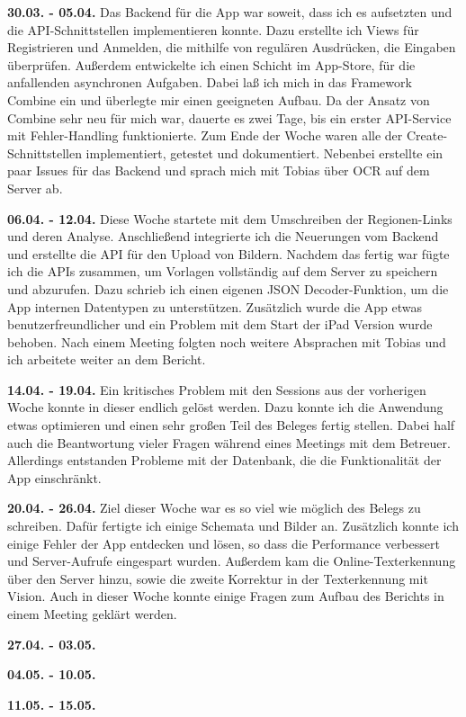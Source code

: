 \documentclass[nomenclature, oneside, 150]{HSMW-Thesis}
\begin{document}
	\textbf{30.03. - 05.04.} 
	Das Backend für die App war soweit, dass ich es aufsetzten und die API-Schnittstellen implementieren konnte. Dazu erstellte ich Views für Registrieren und Anmelden, die mithilfe von regulären Ausdrücken, die Eingaben überprüfen. Außerdem entwickelte ich einen Schicht im App-Store, für die anfallenden asynchronen Aufgaben. Dabei laß ich mich in das Framework Combine ein und überlegte mir einen geeigneten Aufbau. Da der Ansatz von Combine sehr neu für mich war, dauerte es zwei Tage, bis ein erster API-Service mit Fehler-Handling funktionierte. Zum Ende der Woche waren alle der Create-Schnittstellen implementiert, getestet und dokumentiert. Nebenbei erstellte ein paar Issues für das Backend und sprach mich mit Tobias über OCR auf dem Server ab.
	
	\textbf{06.04. - 12.04.}
	Diese Woche startete mit dem Umschreiben der Regionen-Links und deren Analyse. Anschließend integrierte ich die Neuerungen vom Backend und erstellte die API für den Upload von Bildern. Nachdem das fertig war fügte ich die APIs zusammen, um Vorlagen vollständig auf dem Server zu speichern und abzurufen. Dazu schrieb ich einen eigenen JSON Decoder-Funktion, um die App internen Datentypen zu unterstützen. Zusätzlich wurde die App etwas benutzerfreundlicher und ein Problem mit dem Start der iPad Version wurde behoben. Nach einem Meeting folgten noch weitere Absprachen mit Tobias und ich arbeitete weiter an dem Bericht.
	
	\textbf{14.04. - 19.04.}
	Ein kritisches Problem mit den Sessions aus der vorherigen Woche konnte in dieser endlich gelöst werden. Dazu konnte ich die Anwendung etwas optimieren und einen sehr großen Teil des Beleges fertig stellen. Dabei half auch die Beantwortung vieler Fragen während eines Meetings mit dem Betreuer. Allerdings entstanden Probleme mit der Datenbank, die die Funktionalität der App einschränkt.
	
	\textbf{20.04. - 26.04.}
	Ziel dieser Woche war es so viel wie möglich des Belegs zu schreiben. Dafür fertigte ich einige Schemata und Bilder an. Zusätzlich konnte ich einige Fehler der App entdecken und lösen, so dass die Performance verbessert und Server-Aufrufe eingespart wurden. Außerdem kam die Online-Texterkennung über den Server hinzu, sowie die zweite Korrektur in der Texterkennung mit Vision. Auch in dieser Woche konnte einige Fragen zum Aufbau des Berichts in einem Meeting geklärt werden. 
	
	\textbf{27.04. - 03.05.}
	
	\textbf{04.05. - 10.05.}
	
	\textbf{11.05. - 15.05.}




\end{document}
